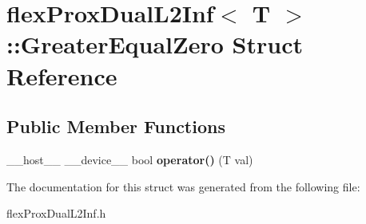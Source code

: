 \hypertarget{structflex_prox_dual_l2_inf_1_1_greater_equal_zero}{}\section{flex\+Prox\+Dual\+L2\+Inf$<$ T $>$\+:\+:Greater\+Equal\+Zero Struct Reference}
\label{structflex_prox_dual_l2_inf_1_1_greater_equal_zero}
\subsection*{Public Member Functions}
\begin{DoxyCompactItemize}
\item 
\mbox{\label{structflex_prox_dual_l2_inf_1_1_greater_equal_zero_a7542eeceded196cd2dbcaa4960228baa}} 
\+\_\+\+\_\+host\+\_\+\+\_\+ \+\_\+\+\_\+device\+\_\+\+\_\+ bool {\bfseries operator()} (T val)
\end{DoxyCompactItemize}


The documentation for this struct was generated from the following file\+:\begin{DoxyCompactItemize}
\item 
flex\+Prox\+Dual\+L2\+Inf.\+h\end{DoxyCompactItemize}

